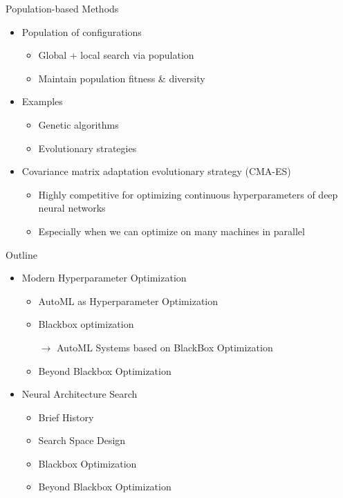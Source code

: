 \begin{frame}[c]{Population-based Methods}
\begin{itemize}
	\item Population of configurations
	\begin{itemize}
		\item Global + local search via population
		\item Maintain population \alert{fitness \& diversity}
	\end{itemize}
	\item Examples
	\begin{itemize}
		\item Genetic algorithms 
		\item Evolutionary strategies 
	\end{itemize}
	\item Covariance matrix adaptation evolutionary strategy (CMA-ES)
	\begin{itemize}
		\item Highly competitive for optimizing continuous hyperparameters of
		deep neural networks 
		\item Especially when we can optimize on many machines in parallel
	\end{itemize}
\end{itemize}
\end{frame}
\begin{frame}[c]{Outline}
\begin{itemize}
	\item Modern Hyperparameter Optimization
	\begin{itemize}
		\item AutoML as Hyperparameter Optimization
		\item Blackbox optimization
		\item[$\to$] AutoML Systems based on BlackBox Optimization
		\item Beyond Blackbox Optimization 
	\end{itemize}
	\item Neural Architecture Search
	\begin{itemize}
		\item Brief History
		\item Search Space Design
		\item Blackbox Optimization
		\item Beyond Blackbox Optimization
	\end{itemize}
\end{itemize}
\end{frame}
